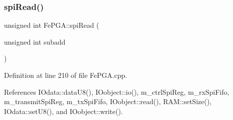 \mbox{\label{classFePGA_a165f5b70ad30af106ecf9a3ace71d4eb}} 
\subsubsection{\texorpdfstring{spi\+Read()}{spiRead()}\hspace{0.1cm}{\footnotesize\ttfamily [3/3]}}
{\footnotesize\ttfamily unsigned int Fe\+P\+G\+A\+::spi\+Read (\begin{DoxyParamCaption}\item[{unsigned int}]{subadd }\end{DoxyParamCaption})}



Definition at line 210 of file Fe\+P\+G\+A.\+cpp.



References I\+Odata\+::data\+U8(), I\+Oobject\+::io(), m\+\_\+ctrl\+Spi\+Reg, m\+\_\+rx\+Spi\+Fifo, m\+\_\+transmit\+Spi\+Reg, m\+\_\+tx\+Spi\+Fifo, I\+Oobject\+::read(), R\+A\+M\+::set\+Size(), I\+Odata\+::set\+U8(), and I\+Oobject\+::write().


